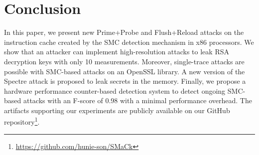 \section{Conclusion}\label{sec:conclusion}
In this paper, we present new Prime+Probe and Flush+Reload attacks on the instruction cache created by the SMC detection mechanism in x86 processors. We show that an attacker can implement high-resolution attacks to leak RSA decryption keys with only 10 measurements. Moreover, single-trace attacks are possible with SMC-based attacks on an OpenSSL library. A new version of the Spectre attack is proposed to leak secrets in the memory. Finally, we propose a hardware performance counter-based detection system to detect ongoing SMC-based attacks with an F-score of 0.98 with a minimal performance overhead. The artifacts supporting our experiments are publicly available on our GitHub repository\footnote{\url{https://github.com/hunie-son/SMaCk}}.
